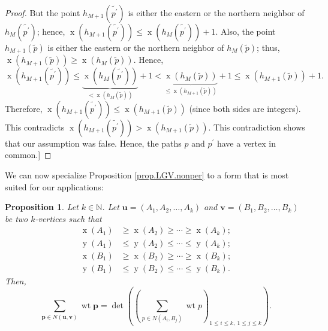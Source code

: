 \documentclass[reqno]{amsart}%
\newcommand{\0}{\phantom{c}}
\let\sumnonlimits\sum
\renewcommand{\sum}{\sumnonlimits\limits}
\theoremstyle{plain}
\newtheorem{prop}[thm]{Proposition}
\theoremstyle{definition}
\numberwithin{equation}{section}
\begin{document}
\begin{proof}
But the point $h_{M+1}\left(  \widetilde{p^{\prime}}\right)  $ is either the
eastern or the northern neighbor of $h_{M}\left(  \widetilde{p^{\prime}%
}\right)  $; hence, $\operatorname*{x}\left(  h_{M+1}\left(
\widetilde{p^{\prime}}\right)  \right)  \leq\operatorname*{x}\left(
h_{M}\left(  \widetilde{p^{\prime}}\right)  \right)  +1$. Also, the point
$h_{M+1}\left(  \widetilde{p}\right)  $ is either the eastern or the northern
neighbor of $h_{M}\left(  \widetilde{p}\right)  $; thus, $\operatorname*{x}%
\left(  h_{M+1}\left(  \widetilde{p}\right)  \right)  \geq\operatorname*{x}%
\left(  h_{M}\left(  \widetilde{p}\right)  \right)  $. Hence,
\[
\operatorname*{x}\left(  h_{M+1}\left(  \widetilde{p^{\prime}}\right)
\right)  \leq\underbrace{\operatorname*{x}\left(  h_{M}\left(
\widetilde{p^{\prime}}\right)  \right)  }_{<\operatorname*{x}\left(
h_{M}\left(  \widetilde{p}\right)  \right)  }+1<\underbrace{\operatorname*{x}%
\left(  h_{M}\left(  \widetilde{p}\right)  \right)  }_{\leq\operatorname*{x}%
\left(  h_{M+1}\left(  \widetilde{p}\right)  \right)  }+1\leq\operatorname*{x}%
\left(  h_{M+1}\left(  \widetilde{p}\right)  \right)  +1.
\]
Therefore, $\operatorname*{x}\left(  h_{M+1}\left(  \widetilde{p^{\prime}%
}\right)  \right)  \leq\operatorname*{x}\left(  h_{M+1}\left(  \widetilde{p}%
\right)  \right)  $ (since both sides are integers). This contradicts
$\operatorname*{x}\left(  h_{M+1}\left(  \widetilde{p^{\prime}}\right)
\right)  >\operatorname*{x}\left(  h_{M+1}\left(  \widetilde{p}\right)
\right)  $. This contradiction shows that our assumption was false. Hence, the
paths $p$ and $p^{\prime}$ have a vertex in common.]
\end{proof}

We can now specialize Proposition \ref{prop.LGV.nonper} to a form that is most
suited for our applications:

\begin{prop}
\label{prop.LGV.concrete}Let $k\in\mathbb{N}$. Let $\mathbf{u}=\left(
A_{1},A_{2},\ldots,A_{k}\right)  $ and $\mathbf{v}=\left(  B_{1},B_{2}%
,\ldots,B_{k}\right)  $ be two $k$-vertices such that%
\begin{align*}
\operatorname*{x}\left(  A_{1}\right)   &  \geq\operatorname*{x}\left(
A_{2}\right)  \geq\cdots\geq\operatorname*{x}\left(  A_{k}\right)  ;\\
\operatorname*{y}\left(  A_{1}\right)   &  \leq\operatorname*{y}\left(
A_{2}\right)  \leq\cdots\leq\operatorname*{y}\left(  A_{k}\right)  ;\\
\operatorname*{x}\left(  B_{1}\right)   &  \geq\operatorname*{x}\left(
B_{2}\right)  \geq\cdots\geq\operatorname*{x}\left(  B_{k}\right)  ;\\
\operatorname*{y}\left(  B_{1}\right)   &  \leq\operatorname*{y}\left(
B_{2}\right)  \leq\cdots\leq\operatorname*{y}\left(  B_{k}\right)  .
\end{align*}
Then,%
\[
\sum_{\mathbf{p}\in N\left(  \mathbf{u},\mathbf{v}\right)  }\operatorname*{wt}%
\mathbf{p}=\det\left(  \left(  \sum_{p\in N\left(  A_{i},B_{j}\right)
}\operatorname*{wt}p\right)  _{1\leq i\leq k,\ 1\leq j\leq k}\right)  .
\]

\end{prop}
\end{document}
